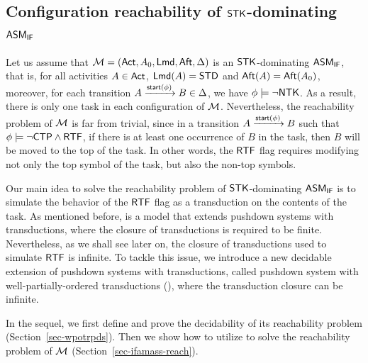



\subsection{Configuration reachability of $\mathsf{STK}$-dominating $\textsf{ASM}_\textsf{IF}$}
Let us assume that ${\mathcal{M} } = ({\sf Act}, A_0, {\sf Lmd}, {\sf Aft}, \Delta)$ is an $\mathsf{STK}$-dominating $\textsf{ASM}_\textsf{IF}$, that is, for all activities $A \in {\sf Act}$, ${\sf Lmd}(A) = {\sf STD}$ and ${\sf Aft}(A) = {\sf Aft}(A_0)$, moreover, for each transition $A \xrightarrow{{\mathsf{start} }(\phi)} B \in \Delta$, we have $\phi \models \neg {\sf NTK}$. As a result, there is only one task in each configuration of ${\mathcal{M} }$.
Nevertheless, the reachability problem of ${\mathcal{M} }$ is far from trivial, since in a transition $A \xrightarrow{{\mathsf{start} }(\phi)} B$ such that $\phi \models \neg {\sf CTP} \wedge {\sf RTF}$, if there is at least one occurrence of $B$ in the task, then $B$ will be moved to the top of the task. In other words, the ${\sf RTF}$ flag requires modifying not only the top symbol of the task, but also the non-top symbols. 

Our main idea to solve the reachability problem of $\mathsf{STK}$-dominating $\textsf{ASM}_\textsf{IF}$ is to simulate the behavior of the ${\sf RTF}$ flag as a transduction on the contents of the task. As mentioned before, {\TrPDS} is a model that extends pushdown systems with transductions, where the closure of transductions is required to be finite. Nevertheless, as we shall see later on, the closure of transductions used to simulate ${\sf RTF}$ is infinite. To tackle this issue, we introduce a new decidable extension of pushdown systems with transductions, called pushdown system with well-partially-ordered transductions (\WOTrPDS), where the transduction closure can be infinite. 

In the sequel, we first define {\WOTrPDS} and prove the decidability of its reachability problem (Section~\ref{sec-wpotrpds}). Then we show how to utilize {\WOTrPDS} to solve the reachability problem of ${\mathcal{M} }$ (Section~\ref{sec-ifamass-reach}). 

